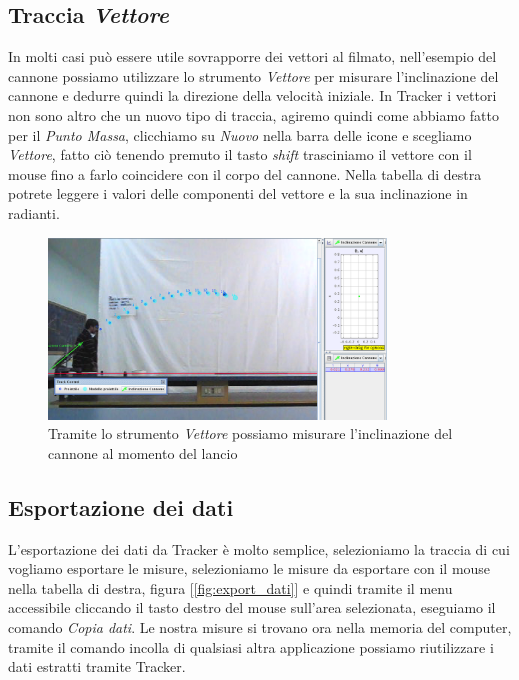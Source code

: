 \documentclass[a4paper,10pt,oneside]{article}
\begin{document}
\subsection*{Traccia \emph{Vettore}}

In molti casi può essere utile sovrapporre dei vettori al  filmato, nell'esempio del cannone possiamo utilizzare lo strumento \emph{Vettore} per misurare l'inclinazione del cannone e dedurre quindi la direzione della velocità iniziale. In Tracker i vettori non sono altro che un nuovo tipo di traccia, agiremo quindi come abbiamo fatto per il \emph{Punto Massa}, clicchiamo su \emph{Nuovo} nella barra delle icone e scegliamo \emph{Vettore}, fatto ciò tenendo premuto il tasto \textsl{shift} trasciniamo il vettore con il mouse fino a farlo coincidere con il corpo del cannone. Nella tabella di destra potrete leggere i valori delle componenti del vettore e la sua inclinazione in radianti.

\begin{figure}[H]
 \centering
 \includegraphics[width=0.8\textwidth]{./immagini/inclinazione_cannone.png}
 \caption{Tramite lo strumento \emph{Vettore} possiamo misurare l'inclinazione del cannone al momento del lancio}
 \label{fig:inclinazione_cannone}
\end{figure}


\subsection*{Esportazione dei dati}

L'esportazione dei dati da Tracker è molto semplice, selezioniamo la traccia di cui vogliamo esportare le misure, selezioniamo le misure da esportare con il mouse nella tabella di destra, figura [\ref{fig:export_dati}] e quindi tramite il menu accessibile cliccando il tasto destro del mouse sull'area selezionata, eseguiamo il comando \emph{Copia dati}. Le nostra misure si trovano ora nella memoria del computer, tramite il comando incolla di qualsiasi altra applicazione possiamo riutilizzare i dati estratti tramite Tracker.
\end{document}
